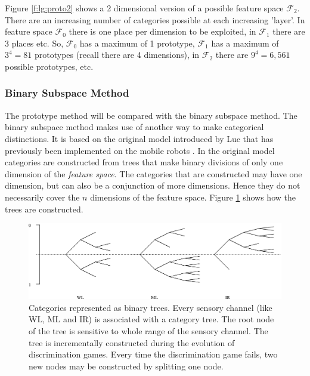 Figure \ref{f:lg:proto2} shows a 2 dimensional version of a possible feature space ${\mathcal F}_2$. There are an increasing number of categories possible at each increasing 'layer'. In feature space ${\mathcal F}_0$ there is one place per dimension to be exploited, in ${\mathcal F}_1$ there are 3 places etc. So, ${\mathcal F}_0$ has a maximum of 1 prototype, ${\mathcal F}_1$ has a maximum of $3^4=81$ prototypes (recall there are 4 dimensions), in ${\mathcal F}_2$ there are $9^4=6,561$ possible prototypes, etc. 


\subsubsection{Binary Subspace Method}\label{s:cm:binary}

The prototype method will be compared with the binary subspace method. The binary subspace method makes use of another way to make categorical distinctions. It is based on the original model introduced by Luc \citet{steels:1996b} that has previously been implemented on the mobile robots \citep{steelsvogt:1997,vogt:1998a}. In the original model categories are constructed from trees that make binary divisions of only one dimension of the {\em feature space}. The categories that are constructed may have one dimension, but can also be a conjunction of more dimensions. Hence they do not necessarily cover the $n$ dimensions of the feature space. Figure \ref{f:lg:binarytree} shows how the trees are constructed.


\begin{figure}[t]
\centerline{\includegraphics[width=12cm]{discr_games/binary_tree.eps}}
\caption{Categories represented as binary trees. Every sensory channel (like WL, ML and IR) is associated with a category tree. The root node of the tree is sensitive to whole range of the sensory channel. The tree is incrementally constructed during the evolution of discrimination games. Every time the discrimination game fails, two new nodes may be constructed by splitting one node.}
\label{f:lg:binarytree}
\end{figure}


